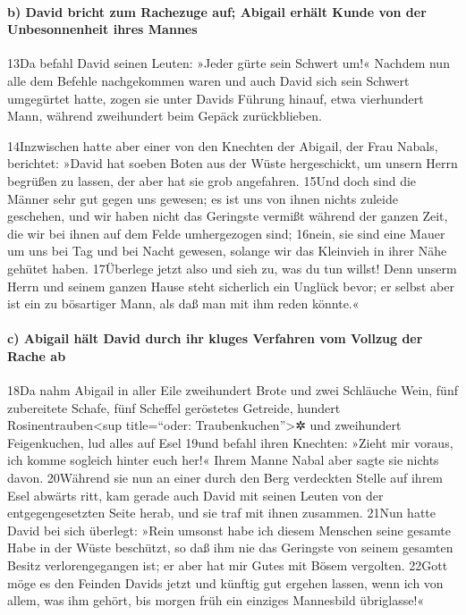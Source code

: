 \hypertarget{b-david-bricht-zum-rachezuge-auf-abigail-erhuxe4lt-kunde-von-der-unbesonnenheit-ihres-mannes}{%
\paragraph{b) David bricht zum Rachezuge auf; Abigail erhält Kunde von
der Unbesonnenheit ihres
Mannes}\label{b-david-bricht-zum-rachezuge-auf-abigail-erhuxe4lt-kunde-von-der-unbesonnenheit-ihres-mannes}}

13Da befahl David seinen Leuten: »Jeder gürte sein Schwert um!« Nachdem
nun alle dem Befehle nachgekommen waren und auch David sich sein Schwert
umgegürtet hatte, zogen sie unter Davids Führung hinauf, etwa
vierhundert Mann, während zweihundert beim Gepäck zurückblieben.

14Inzwischen hatte aber einer von den Knechten der Abigail, der Frau
Nabals, berichtet: »David hat soeben Boten aus der Wüste hergeschickt,
um unsern Herrn begrüßen zu lassen, der aber hat sie grob angefahren.
15Und doch sind die Männer sehr gut gegen uns gewesen; es ist uns von
ihnen nichts zuleide geschehen, und wir haben nicht das Geringste
vermißt während der ganzen Zeit, die wir bei ihnen auf dem Felde
umhergezogen sind; 16nein, sie sind eine Mauer um uns bei Tag und bei
Nacht gewesen, solange wir das Kleinvieh in ihrer Nähe gehütet haben.
17Überlege jetzt also und sieh zu, was du tun willst! Denn unserm Herrn
und seinem ganzen Hause steht sicherlich ein Unglück bevor; er selbst
aber ist ein zu bösartiger Mann, als daß man mit ihm reden könnte.«

\hypertarget{c-abigail-huxe4lt-david-durch-ihr-kluges-verfahren-vom-vollzug-der-rache-ab}{%
\paragraph{c) Abigail hält David durch ihr kluges Verfahren vom Vollzug
der Rache
ab}\label{c-abigail-huxe4lt-david-durch-ihr-kluges-verfahren-vom-vollzug-der-rache-ab}}

18Da nahm Abigail in aller Eile zweihundert Brote und zwei Schläuche
Wein, fünf zubereitete Schafe, fünf Scheffel geröstetes Getreide,
hundert Rosinentrauben\textless sup title=``oder:
Traubenkuchen''\textgreater✲ und zweihundert Feigenkuchen, lud alles auf
Esel 19und befahl ihren Knechten: »Zieht mir voraus, ich komme sogleich
hinter euch her!« Ihrem Manne Nabal aber sagte sie nichts davon.
20Während sie nun an einer durch den Berg verdeckten Stelle auf ihrem
Esel abwärts ritt, kam gerade auch David mit seinen Leuten von der
entgegengesetzten Seite herab, und sie traf mit ihnen zusammen. 21Nun
hatte David bei sich überlegt: »Rein umsonst habe ich diesem Menschen
seine gesamte Habe in der Wüste beschützt, so daß ihm nie das Geringste
von seinem gesamten Besitz verlorengegangen ist; er aber hat mir Gutes
mit Bösem vergolten. 22Gott möge es den Feinden Davids jetzt und künftig
gut ergehen lassen, wenn ich von allem, was ihm gehört, bis morgen früh
ein einziges Mannesbild übriglasse!«

